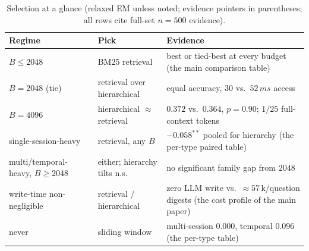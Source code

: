 \documentclass{article} %
\begin{document}
\begin{table}[h]
\centering\scriptsize
\caption{Selection at a glance (relaxed EM unless noted; evidence pointers in
parentheses; all rows cite full-set $n{=}500$ evidence).}
\label{tab:atglance}
\begin{tabular}{@{}lll@{}}
\toprule
Regime & Pick & Evidence \\
\midrule
$B \leq 2048$ & BM25 retrieval & best or tied-best at every budget (the main comparison table) \\
$B = 2048$ (tie) & retrieval over hierarchical & equal accuracy, $30$ vs.\ $52\,ms$ access \\
$B = 4096$ & hierarchical $\approx$ retrieval & $0.372$ vs.\ $0.364$, $p{=}0.90$; $1/25$ full-context tokens \\
single-session-heavy & retrieval, any $B$ & $-0.058^{**}$ pooled for hierarchy (the per-type paired table) \\
multi/temporal-heavy, $B \geq 2048$ & either; hierarchy tilts n.s. & no significant family gap from $2048$ \\
write-time non-negligible & retrieval / hierarchical & zero LLM write vs.\ $\approx 57$\,k/question digests (the cost profile of the main paper) \\
never & sliding window & multi-session $0.000$, temporal $0.096$ (the per-type table) \\
\bottomrule
\end{tabular}
\end{table}
\end{document}
